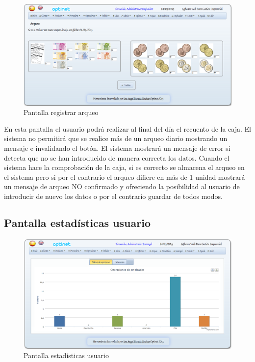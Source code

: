 \documentclass[a4paper,11pt]{book}
\begin{document}
\begin{figure}[!htb]
  \centering
    \includegraphics[scale=0.35]{capnuevoarqueo.png}
  \caption{Pantalla registrar arqueo}
  \label{a}
\end{figure}

En esta pantalla el usuario podrá realizar al final del día el recuento de la caja. El sistema no permitirá que se realice más de un arqueo diario mostrando un mensaje e invalidando el botón. El sistema mostrará un mensaje de error si detecta que no se han introducido de manera correcta los datos. Cuando el sistema hace la comprobación de la caja, si es correcto se almacena el arqueo en el sistema pero si por el contrario el arqueo difiere en más de 1 unidad mostrará un mensaje de arqueo NO confirmado y ofreciendo la posibilidad al usuario de introducir de nuevo los datos o por el contrario guardar de todos modos.

\newpage
\subsection {Pantalla estadísticas usuario}

\begin{figure}[!htb]
  \centering
    \includegraphics[scale=0.35]{capestadisticasemp.png}
  \caption{Pantalla estadísticas usuario}
  \label{a}
\end{figure}
\end{document}
